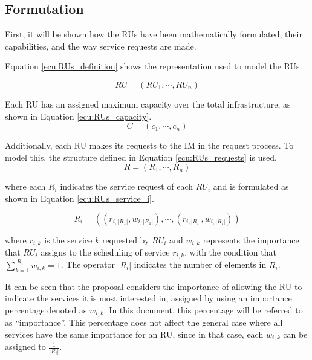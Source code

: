 \documentclass[preprint,12pt]{elsarticle}
\begin{document}
\subsection{Formutation}\label{sec:formulation}

First, it will be shown how the \glspl{RU} have been mathematically formulated, their capabilities, and the way service requests are made. 

Equation \ref{ecu:RUs_definition} shows the representation used to model the \glspl{RU}.

\begin{equation}\label{ecu:RUs_definition}
    RU = (RU_1, \cdots, RU_n)
\end{equation}

Each RU has an assigned maximum capacity over the total infrastructure, as shown in Equation \ref{ecu:RUs_capacity}. 
    \begin{equation}\label{ecu:RUs_capacity}
        C = (c_1, \cdots, c_n )
    \end{equation}

Additionally, each \gls{RU} makes its requests to the \gls{IM} in the request process. To model this, the structure defined in Equation \ref{ecu:RUs_requests} is used.
\begin{equation}\label{ecu:RUs_requests}
    R = (R_1, \cdots, R_n)
\end{equation}

where each $R_i$ indicates the service request of each $RU_i$ and is formulated as shown in Equation \ref{ecu:RUs_service_i}.


\begin{equation}\label{ecu:RUs_service_i}
    R_i = ( (r_{i,|R_1|},w_{i,|R_1|}), \cdots, (r_{i,|R_i|},w_{i,|R_i|}) )
\end{equation}

where $r_{i,k}$ is the service $k$ requested by $RU_i$ and $w_{i,k}$ represents the importance that $RU_i$ assigns to the scheduling of service $r_{i,k}$, with the condition that $\sum^{|R_i|}_{k=1} w_{i,k} = 1$. The operator $|R_i|$ indicates the number of elements in $R_i$.

It can be seen that the proposal considers the importance of allowing the RU to indicate the services it is most interested in, assigned by using an importance percentage denoted as $w_{i,k}$. In this document, this percentage will be referred to as ``importance''. This percentage does not affect the general case where all services have the same importance for an RU, since in that case, each $w_{i,k}$ can be assigned to $\frac{1}{|R_i|}$.
\end{document}

